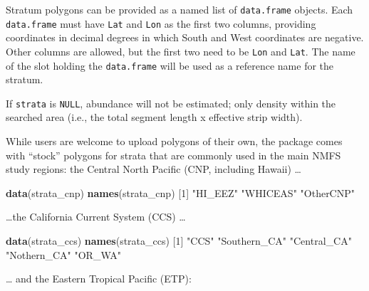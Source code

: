 \documentclass[
]{book}
\newenvironment{Shaded}{\begin{snugshade}}{\end{snugshade}}
\newcommand{\DecValTok}[1]{\textcolor[rgb]{0.00,0.00,0.81}{#1}}
\newcommand{\KeywordTok}[1]{\textcolor[rgb]{0.13,0.29,0.53}{\textbf{#1}}}
\newcommand{\NormalTok}[1]{#1}
\newcommand{\StringTok}[1]{\textcolor[rgb]{0.31,0.60,0.02}{#1}}
\begin{document}
Stratum polygons can be provided as a named list of \texttt{data.frame} objects. Each \texttt{data.frame} must have \texttt{Lat} and \texttt{Lon} as the first two columns, providing coordinates in decimal degrees in which South and West coordinates are negative. Other columns are allowed, but the first two need to be \texttt{Lon} and \texttt{Lat}. The name of the slot holding the \texttt{data.frame} will be used as a reference name for the stratum.

If \texttt{strata} is \texttt{NULL}, abundance will not be estimated; only density within the searched area (i.e., the total segment length x effective strip width).

While users are welcome to upload polygons of their own, the package comes with ``stock'' polygons for strata that are commonly used in the main NMFS study regions: the Central North Pacific (CNP, including Hawaii) \ldots{}

\begin{Shaded}
\begin{Highlighting}[]
\KeywordTok{data}\NormalTok{(strata_cnp) }
\KeywordTok{names}\NormalTok{(strata_cnp)}
\NormalTok{[}\DecValTok{1}\NormalTok{] }\StringTok{"HI_EEZ"}   \StringTok{"WHICEAS"}  \StringTok{"OtherCNP"}
\end{Highlighting}
\end{Shaded}

\ldots the California Current System (CCS) \ldots{}

\begin{Shaded}
\begin{Highlighting}[]
\KeywordTok{data}\NormalTok{(strata_ccs) }
\KeywordTok{names}\NormalTok{(strata_ccs)}
\NormalTok{[}\DecValTok{1}\NormalTok{] }\StringTok{"CCS"}         \StringTok{"Southern_CA"} \StringTok{"Central_CA"}  \StringTok{"Nothern_CA"}  \StringTok{"OR_WA"}      
\end{Highlighting}
\end{Shaded}

\ldots{} and the Eastern Tropical Pacific (ETP):
\end{document}
